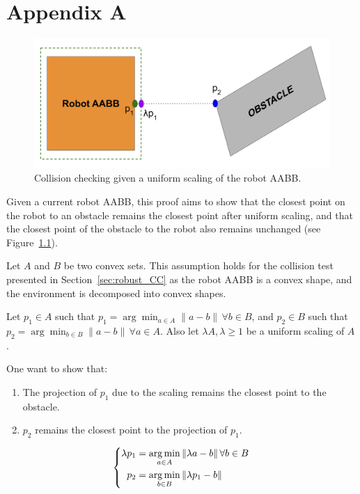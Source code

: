 \chapter{Appendix A}\label{chap:appendixA}

\begin{figure} [t]
    \centering
    \includegraphics[width=0.8\linewidth]{figures/appendix/CCellipse.png}
    \caption{Collision checking given a uniform scaling of the robot AABB.}
    \label{fig:appendix_A}
\end{figure}

Given a current robot AABB, this proof aims to show that the closest point on the robot to an obstacle remains the closest point after uniform scaling, and that the closest point of the obstacle to the robot also remains unchanged (see Figure~\ref{fig:appendix_A}).

Let $A$ and $B$ be two convex sets. 
This assumption holds for the collision test presented in Section~\ref{sec:robust_CC} as the robot AABB is a convex shape, and the environment is decomposed into convex shapes.

Let \( p_1 \in A \) such that \( p_1 = \arg \min_{a \in A} \|a - b\| \, \forall b \in B \), and \( p_2 \in B \) such that \( p_2 = \arg \min_{b \in B} \|a - b\| \, \forall a \in A \).
Also let $\lambda A, \lambda \geq 1$ be a uniform scaling of $A$.

One want to show that:
\begin{enumerate}
    \item The projection of $p_1$ due to the scaling remains the closest point to the obstacle.
    \item $p_2$ remains the closest point to the projection of $p_1$. 
\end{enumerate}
\[
    \left\{
    \begin{aligned}
        \lambda p_1 &= \operatorname*{arg\,min}_{a \in A} \|\lambda a - b\| \, \forall b \in B \\
        p_2 &= \operatorname*{arg\,min}_{b \in B} \|\lambda p_1 - b\|
    \end{aligned}
    \right.
\]

